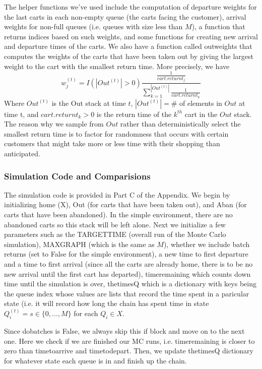 \documentclass[english]{article}
\begin{document}
The helper functions we've used include the computation of departure weights for the last carts in each non-empty queue (the carts facing the customer), arrival weights for non-full queues (i.e. queues with size less than $M$), a function that returns indices based on such weights, and some functions for creating new arrival and departure times of the carts. We also have a function called outweights that computes the weights of the carts that have been taken out by giving the largest weight to the cart with the smallest return time. More precisely, we have
\[
w_{j}^{(t)} = I(|Out^{(t)}|>0) \frac{\frac{1}{cart.returnt_j}}{\sum_{k=1}^{|Out^{(t)}|}\frac{1}{cart.returnt_k}}
\]
Where $Out^{(t)}$ is the Out stack at time $t$, $|Out^{(t)}| =\# $ of elements in $Out$ at time t, and $cart.returnt_k>0$ is the return time of the $k^{th}$ cart in the $Out$ stack. The reason why we sample from $Out$ rather than deterministically select the smallest return time is to factor for randomness that occurs with certain customers that might take more or less time with their shopping than anticipated.

\subsubsection*{Simulation Code and Comparisions}
The simulation code is provided in Part C of the Appendix. We begin by initializing home (X), Out (for carts that have been taken out), and Aban (for carts that have been abandoned). In the simple environment, there are no abandoned carts so this stack will be left alone. Next we initialize a few parameters such as the TARGETTIME (overall run of the Monte Carlo simulation), MAXGRAPH (which is the same as $M$), whether we include batch returns (set to False for the simple environment), a new time to first departure and a time to first arrival (since all the carts are already home, there is to be no new arrival until the first cart has departed), timeremaining which counts down time until the simulation is over, thetimesQ which is a dictionary with keys being the queue index whose values are lists that record the time spent in a paricular state (i.e. it will record how long the chain has spent time in state $Q_{i}^{(t)} = s \in \{ 0,...,M\}$ for each $Q_{i} \in X$. 

Since dobatches is False, we always skip this if block and move on to the next one. Here we check if we are finished our MC runs, i.e. timeremaining is closer to zero than timetoarrive and timetodepart. Then, we update thetimesQ dictionary for whatever state each queue is in and finish up the chain.
\end{document}
